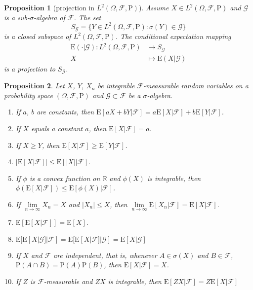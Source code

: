 \documentclass{article}
\newtheorem{proposition}{Proposition}[section]
\theoremstyle{nonumberplain}
\begin{document}
\begin{proposition}[projection in $L^2(\Omega,\mathcal{F},\mathrm{P})$]
	Assume $X\in L^2(\Omega,\mathcal{F},\mathrm{P})$ and $\mathcal{G}$ is a sub-$\sigma$-algebra of $\mathcal{F}$. The set
	\[
	S_\mathcal{G}=\{Y\in L^2(\Omega,\mathcal{F},\mathrm{P}):\sigma(Y)\in \mathcal{G}\}
	\]
	is a closed subspace of $L^2(\Omega,\mathcal{F},\mathrm{P})$.
	The conditional expectation mapping
	\begin{align*}
	\mathrm{E}(\cdot|\mathcal{G}):L^2(\Omega,\mathcal{F},\mathrm{P})&\longrightarrow S_\mathcal{G}\\
	X&\longmapsto \mathrm{E}(X|\mathcal{G})
	\end{align*}
	is a projection to $S_\mathcal{G}$.
\end{proposition}

\begin{proposition}
	Let $X$, $Y$, $X_n$ be integrable $\mathcal{F}$-measurable random variables on a probability space $(\Omega,\mathcal{F},\mathrm{P})$ and  $\mathcal{G}\subset\mathcal{F}$ be a $\sigma$-algebra.
	\begin{enumerate}  
		\item If $a$, $b$ are constants, then $\mathrm{E}[aX+bY|\mathcal{F}]=a\mathrm{E}[X|\mathcal{F}]+b\mathrm{E}[Y|\mathcal{F}]$.
		\item If $X$ equals a constant $a$, then $\mathrm{E}[X|\mathcal{F}]=a$.
		\item If $X\ge Y$,  then $\mathrm{E}[X|\mathcal{F}]\ge\mathrm{E}[Y|\mathcal{F}]$.
		\item $\left|\mathrm{E}[X|\mathcal{F}]\right|\le\mathrm{E}[\left|X\right||\mathcal{F}]$.
		\item If $\phi$ is a convex function on $\mathbb{R}$ and $\phi(X)$ is integrable, then $\phi(\mathrm{E}[X|\mathcal{F}])\le\mathrm{E}[\phi(X)|\mathcal{F}]$.
		\item If $\lim\limits_{n\to\infty}X_n=X$ and $|X_n|\le X$, then $\lim\limits_{n\to\infty}\mathrm{E}[X_n|\mathcal{F}]=\mathrm{E}[X|\mathcal{F}]$.
		\item $\mathrm{E}[\mathrm{E}[X|\mathcal{F}]]=\mathrm{E}[X]$.
		\item $\mathrm{E}[\mathrm{E}[X|\mathcal{G}]|\mathcal{F}]=\mathrm{E}[\mathrm{E}[X|\mathcal{F}]|\mathcal{G}]=\mathrm{E}[X|\mathcal{G}]$
		\item If $X$ and $\mathcal{F}$ are independent, that is, whenever $A\in\sigma(X)$ and $B\in\mathcal{F}$, $\mathrm{P}(A\cap B)= \mathrm{P}(A) \mathrm{P}(B)$, then $\mathrm{E}[X|\mathcal{F}]=X$.
		\item If $Z$ is $\mathcal{F}$-measurable and $ZX$ is integrable, then $\mathrm{E}[ZX|\mathcal{F}]=Z\mathrm{E}[X|\mathcal{F}]$
	\end{enumerate}
\end{proposition}
\end{document}
